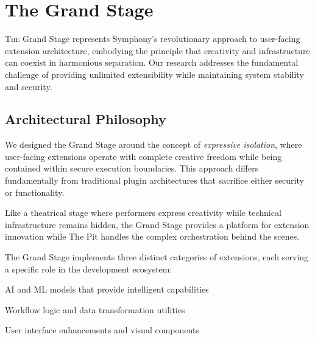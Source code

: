 
\section*{The Grand Stage}

\lettrine{T}{he} Grand Stage represents Symphony's revolutionary approach to user-facing extension architecture, embodying the principle that creativity and infrastructure can coexist in harmonious separation. Our research addresses the fundamental challenge of providing unlimited extensibility while maintaining system stability and security.

\subsection*{Architectural Philosophy}

We designed the Grand Stage around the concept of \textit{expressive isolation}, where user-facing extensions operate with complete creative freedom while being contained within secure execution boundaries. This approach differs fundamentally from traditional plugin architectures that sacrifice either security or functionality.

\begin{infobox}[title=The Grand Stage Metaphor]
Like a theatrical stage where performers express creativity while technical infrastructure remains hidden, the Grand Stage provides a platform for extension innovation while The Pit handles the complex orchestration behind the scenes.
\end{infobox}

The Grand Stage implements three distinct categories of extensions, each serving a specific role in the development ecosystem:

\begin{description}[leftmargin=3cm,labelwidth=2.5cm]
    \item[\textbf{Instruments}] AI and ML models that provide intelligent capabilities
    \item[\textbf{Operators}] Workflow logic and data transformation utilities
    \item[\textbf{Motifs}] User interface enhancements and visual components
\end{description}

